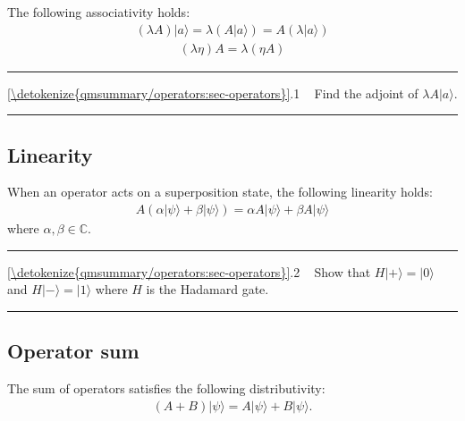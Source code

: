 \documentclass[letterpaper,10pt,english]{jupyterBook}
\begin{document}
\sphinxAtStartPar
The following associativity holds:
\begin{equation*}
\begin{split}
(\lambda A) |a\rangle = \lambda (A  |a\rangle) = A (\lambda  |a\rangle)
\end{split}
\end{equation*}\begin{equation*}
\begin{split}
(\lambda \eta) A = \lambda (\eta A)
\end{split}
\end{equation*}

\bigskip\hrule\bigskip


\sphinxAtStartPar
{} \hyperref[\detokenize{qmsummary/operators:sec-operators}]{\ref{\detokenize{qmsummary/operators:sec-operators}}}.1     Find the adjoint of \(\lambda A  |a\rangle\).


\bigskip\hrule\bigskip



\subsection{Linearity}
\label{\detokenize{qmsummary/operators:linearity}}
\sphinxAtStartPar
When an operator acts on a superposition state, the following linearity holds:
\begin{equation*}
\begin{split}
A \left(\alpha  |\psi\rangle + \beta|\psi\rangle\right) = \alpha A |\psi\rangle + \beta A |\psi\rangle
\end{split}
\end{equation*}
\sphinxAtStartPar
where \(\alpha, \beta \in \mathbb{C}\).


\bigskip\hrule\bigskip


\sphinxAtStartPar
{} \hyperref[\detokenize{qmsummary/operators:sec-operators}]{\ref{\detokenize{qmsummary/operators:sec-operators}}}.2     Show that \(H|+\rangle = |0\rangle\) and \(H |-\rangle = |1\rangle\) where \(H\) is the Hadamard gate.


\bigskip\hrule\bigskip



\subsection{Operator sum}
\label{\detokenize{qmsummary/operators:operator-sum}}
\sphinxAtStartPar
The sum of operators satisfies the following distributivity:
\begin{equation*}
\begin{split}
\left(A+B\right)|\psi\rangle = A |\psi\rangle + B |\psi\rangle.
\end{split}
\end{equation*}
\end{document}
